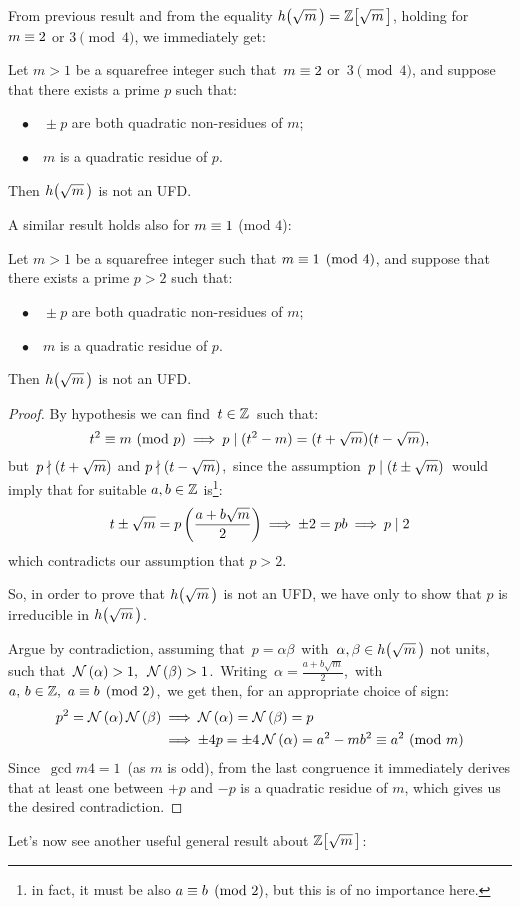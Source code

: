 %
From previous result and from the equality $\hh{m} = \ZZ{m}$, holding
for $m \equiv 2$ or $3 \pmod 4$, we immediately get:

\begin{cor}\label{basic_negative_result_for_uniqueness_1'} 
Let $m > 1$ be a squarefree integer such that\, $m \equiv 2$ or\,
$3 \pmod 4$, and suppose that there exists a prime $p$ such that:

~~$\bullet\quad\!\! \pm{p}$ are both quadratic non-residues
of $m$;

~~$\bullet\quad\! m$ is a quadratic residue of $p$.

Then $\hh{m}$ is not an UFD.
\end{cor}
%

\medskip
A similar result holds also for $m \equiv 1$ (mod $4$):
%
\begin{thm}\label{basic_negative_result_for_uniqueness_2}
Let $m > 1$ be a squarefree integer  such that $m \equiv 1 \pmod 4$,
and suppose that there exists a prime $p > 2$ such that:

~~$\bullet\quad\!\! \pm{p}$ are both quadratic non-residues
of $m$;

~~$\bullet\quad\! m$ is a quadratic residue of $p$.

Then $\hh{m}$ is not an UFD.
\end{thm}

\begin{proof}
%
By hypothesis we can find\, $t \in \mathbb{Z}$\, such that:
$$
t^2 \equiv m\ (\mathrm{mod}\ p)\:\Longrightarrow\: p \mid
(t^2 - m) = (t + \sqrt{m})(t - \sqrt{m}),
$$
but\, $p \nmid (t + \sqrt{m})$ and
$p \nmid (t - \sqrt{m})$,\, since the assumption\,
$p \mid \left(t \pm{\sqrt{m}}\right)$\, would
imply that for suitable $a, b \in \mathbb{Z}$ is\footnote{%
in fact, it must be also $a \equiv b \pmod 2$, but this is
of no importance here.}:
$$
t \pm{\sqrt{m}} = p\left(\frac{a + b\sqrt{m}}{2}\right)
\:\Longrightarrow\: \pm{2} = pb \:\Longrightarrow\: p \mid 2
$$
which contradicts our assumption that $p > 2$.

So, in order to prove that $\hh{m}$ is not an UFD, we
have only to show that $p$ is irreducible in $\hh{m}$.

Argue by contradiction, assuming that\,
$p = \alpha \beta$\, with\, $\alpha,\beta \in \hh{m}$
not units, \ie such that\,
$\mathcal{N}\left(\alpha\right) > 1,\;\: \mathcal{N}\left(\beta\right) > 1$.\,
Writing\, $\alpha = \frac{a + b\sqrt{m}}{2}$,\, with\,
$a,\,b \in \mathbb{Z},\ a \equiv b \pmod 2$,\, we
get then, for an appropriate choice of sign:
\begin{displaymath} \begin{split}
p^2 = \mathcal{N}\left(\alpha\right)\mathcal{N}\left(\beta\right) & \:\Longrightarrow\: \mathcal{N}\left(\alpha\right) =
\mathcal{N}\left(\beta\right) = p \\
& \:\Longrightarrow\: \pm{4p} = \pm{4\:\mathcal{N}\left(\alpha\right)} 
= a^2 - mb^2 \equiv a^2\ (\mathrm{mod}\ m)
\end{split} \end{displaymath}
Since\, $\gcd{m}{4} = 1$\, (as $m$ is odd), from the
last congruence it immediately derives that at least one
between $+p$ and $-p$ is a quadratic residue of $m$,
which gives us the desired contradiction.
%
\end{proof}
%
Let's now see another useful general result about $\ZZ{m}$:

